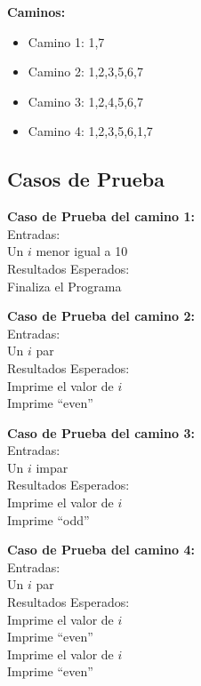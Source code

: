 \documentclass[a4paper,12pt]{article}
\begin{document}
\textbf{Caminos:}

\begin{itemize}
 \item Camino 1: 1,7
 \item Camino 2: 1,2,3,5,6,7
 \item Camino 3: 1,2,4,5,6,7
 \item Camino 4: 1,2,3,5,6,1,7
\end{itemize}

\subsection{Casos de Prueba}

\textbf{Caso de Prueba del camino 1:} \\
Entradas: \\
\hspace*{1cm} Un $i$ menor igual a 10 \\
Resultados Esperados: \\
\hspace*{1cm} Finaliza el Programa \par

\textbf{Caso de Prueba del camino 2:} \\
Entradas: \\
\hspace*{1cm} Un $i$ par \\
Resultados Esperados: \\
\hspace*{1cm} Imprime el valor de $i$ \\
\hspace*{1cm} Imprime ``even''  \par

\textbf{Caso de Prueba del camino 3:} \\
Entradas: \\
\hspace*{1cm} Un $i$ impar \\
Resultados Esperados: \\
\hspace*{1cm} Imprime el valor de $i$ \\
\hspace*{1cm} Imprime ``odd'' \par

\textbf{Caso de Prueba del camino 4:} \\
Entradas: \\
\hspace*{1cm} Un $i$ par \\
Resultados Esperados:  \\
\hspace*{1cm} Imprime el valor de $i$ \\
\hspace*{1cm} Imprime ``even'' \\
\hspace*{1cm} Imprime el valor de $i$ \\
\hspace*{1cm} Imprime ``even'' \par
\end{document}
